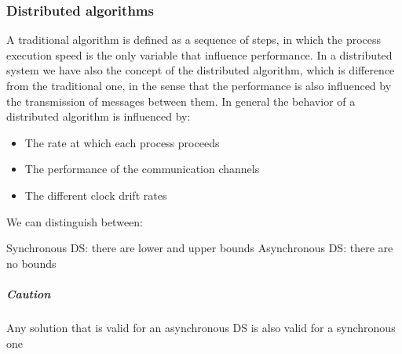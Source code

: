 \documentclass{article}
\begin{document}
    \subsubsection{Distributed algorithms}
    A traditional algorithm is defined as a sequence of steps, in which the process
    execution speed is the only variable that influence performance. In a distributed
    system we have also the concept of the distributed algorithm, which is difference 
    from the traditional one, in the sense that the performance is also influenced by 
    the transmission of messages between them. In general the behavior of a distributed
    algorithm is influenced by:
    \begin{itemize}
        \item The rate at which each process proceeds
        \item The performance of the communication channels
        \item The different clock drift rates
    \end{itemize}
    We can distinguish between:
    \begin{itemize}
        Synchronous DS: there are lower and upper bounds
        Asynchronous DS: there are no bounds
    \end{itemize}
    \subparagraph{Caution}
    Any solution that is valid for an asynchronous DS is also valid for a synchronous one
\end{document}
